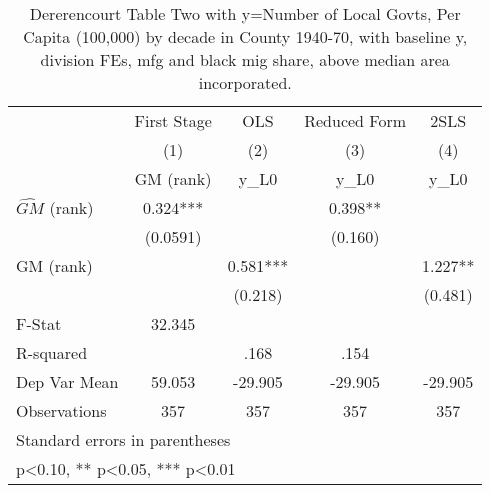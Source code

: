 \begin{table}[htbp]\centering
\def\sym#1{\ifmmode^{#1}\else\(^{#1}\)\fi}
\caption{Dererencourt Table Two with y=Number of Local Govts, Per Capita (100,000) by decade in County 1940-70, with baseline y, division FEs, mfg and black mig share, above median area incorporated.}
\begin{tabular}{l*{4}{c}}
\toprule
                    & First Stage   &         OLS   &Reduced Form   &        2SLS   \\
                    &\multicolumn{1}{c}{(1)}&\multicolumn{1}{c}{(2)}&\multicolumn{1}{c}{(3)}&\multicolumn{1}{c}{(4)}\\
                    &\multicolumn{1}{c}{GM  (rank)}&\multicolumn{1}{c}{y\_L0}&\multicolumn{1}{c}{y\_L0}&\multicolumn{1}{c}{y\_L0}\\
\midrule
$\hat{GM}$ (rank)   &       0.324***&               &       0.398** &               \\
                    &    (0.0591)   &               &     (0.160)   &               \\
\addlinespace
GM  (rank)          &               &       0.581***&               &       1.227** \\
                    &               &     (0.218)   &               &     (0.481)   \\
\midrule
F-Stat              &      32.345   &               &               &               \\
R-squared           &               &        .168   &        .154   &               \\
Dep Var Mean        &      59.053   &     -29.905   &     -29.905   &     -29.905   \\
Observations        &         357   &         357   &         357   &         357   \\
\bottomrule
\multicolumn{5}{l}{\footnotesize Standard errors in parentheses}\\
\multicolumn{5}{l}{\footnotesize * p<0.10, ** p<0.05, *** p<0.01}\\
\end{tabular}
\end{table}
